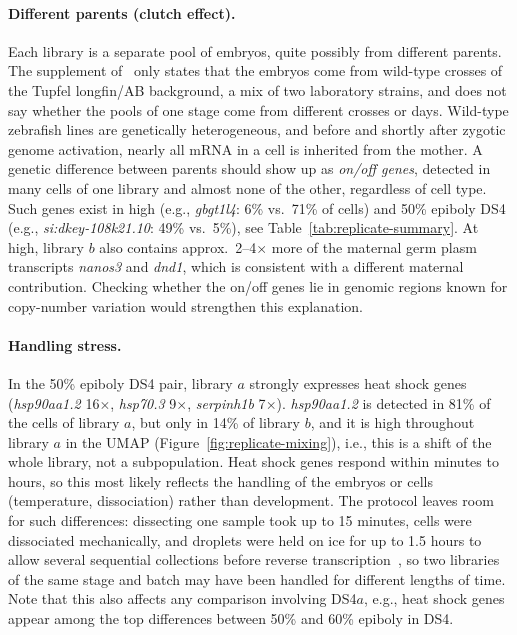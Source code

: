 \documentclass[11pt,a4paper]{article}
\begin{document}
\paragraph{Different parents (clutch effect).} Each library is a separate pool of embryos, quite possibly from different parents. The supplement of~\cite{farrell2018} only states that the embryos come from wild-type crosses of the Tupfel longfin/AB background, a mix of two laboratory strains, and does not say whether the pools of one stage come from different crosses or days. Wild-type zebrafish lines are genetically heterogeneous, and before and shortly after zygotic genome activation, nearly all mRNA in a cell is inherited from the mother. A genetic difference between parents should show up as \emph{on/off genes}, detected in many cells of one library and almost none of the other, regardless of cell type. Such genes exist in high (e.g., \emph{gbgt1l4}: 6\% vs.\ 71\% of cells) and 50\% epiboly DS4 (e.g., \emph{si:dkey-108k21.10}: 49\% vs.\ 5\%), see Table~\ref{tab:replicate-summary}. At high, library $b$ also contains approx.~2--4$\times$ more of the maternal germ plasm transcripts \emph{nanos3} and \emph{dnd1}, which is consistent with a different maternal contribution. Checking whether the on/off genes lie in genomic regions known for copy-number variation would strengthen this explanation.

\paragraph{Handling stress.} In the 50\% epiboly DS4 pair, library $a$ strongly expresses heat shock genes (\emph{hsp90aa1.2} 16$\times$, \emph{hsp70.3} 9$\times$, \emph{serpinh1b} 7$\times$). \emph{hsp90aa1.2} is detected in 81\% of the cells of library $a$, but only in 14\% of library $b$, and it is high throughout library $a$ in the UMAP (Figure~\ref{fig:replicate-mixing}), i.e., this is a shift of the whole library, not a subpopulation. Heat shock genes respond within minutes to hours, so this most likely reflects the handling of the embryos or cells (temperature, dissociation) rather than development. The protocol leaves room for such differences: dissecting one sample took up to 15 minutes, cells were dissociated mechanically, and droplets were held on ice for up to 1.5 hours to allow several sequential collections before reverse transcription~\cite{farrell2018}, so two libraries of the same stage and batch may have been handled for different lengths of time. Note that this also affects any comparison involving DS4$a$, e.g., heat shock genes appear among the top differences between 50\% and 60\% epiboly in DS4.
\end{document}
